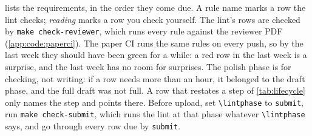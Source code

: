  lists the requirements, in the order they come due. A rule name marks a row the lint checks; \emph{reading} marks a row you check yourself. The lint's rows are checked by \texttt{make check-reviewer}, which runs every rule against the reviewer PDF (\cref{app:code:paperci}). The paper CI runs the same rules on every push, so by the last week they should have been green for a while: a red row in the last week is a surprise, and the last week has no room for surprises. The polish phase is for checking, not writing: if a row needs more than an hour, it belonged to the draft phase, and the full draft was not full. A row that restates a step of \cref{tab:lifecycle} only names the step and points there. Before upload, set \texttt{\textbackslash lintphase} to \texttt{submit}, run \texttt{make check-submit}, which runs the lint at that phase whatever \texttt{\textbackslash lintphase} says, and go through every row due by \texttt{submit}.
